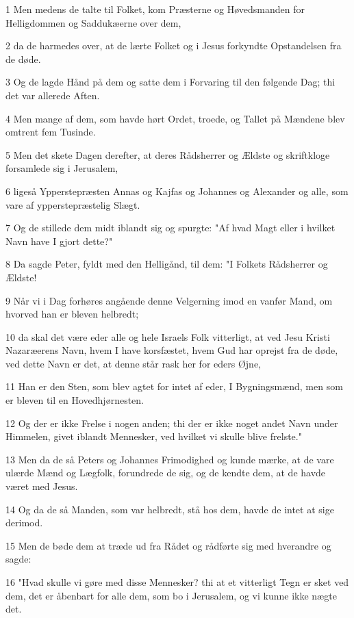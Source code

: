 \par 1 Men medens de talte til Folket, kom Præsterne og Høvedsmanden for Helligdommen og Saddukæerne over dem,
\par 2 da de harmedes over, at de lærte Folket og i Jesus forkyndte Opstandelsen fra de døde.
\par 3 Og de lagde Hånd på dem og satte dem i Forvaring til den følgende Dag; thi det var allerede Aften.
\par 4 Men mange af dem, som havde hørt Ordet, troede, og Tallet på Mændene blev omtrent fem Tusinde.
\par 5 Men det skete Dagen derefter, at deres Rådsherrer og Ældste og skriftkloge forsamlede sig i Jerusalem,
\par 6 ligeså Ypperstepræsten Annas og Kajfas og Johannes og Alexander og alle, som vare af ypperstepræstelig Slægt.
\par 7 Og de stillede dem midt iblandt sig og spurgte: "Af hvad Magt eller i hvilket Navn have I gjort dette?"
\par 8 Da sagde Peter, fyldt med den Helligånd, til dem: "I Folkets Rådsherrer og Ældste!
\par 9 Når vi i Dag forhøres angående denne Velgerning imod en vanfør Mand, om hvorved han er bleven helbredt;
\par 10 da skal det være eder alle og hele Israels Folk vitterligt, at ved Jesu Kristi Nazaræerens Navn, hvem I have korsfæstet, hvem Gud har oprejst fra de døde, ved dette Navn er det, at denne står rask her for eders Øjne,
\par 11 Han er den Sten, som blev agtet for intet af eder, I Bygningsmænd, men som er bleven til en Hovedhjørnesten.
\par 12 Og der er ikke Frelse i nogen anden; thi der er ikke noget andet Navn under Himmelen, givet iblandt Mennesker, ved hvilket vi skulle blive frelste."
\par 13 Men da de så Peters og Johannes Frimodighed og kunde mærke, at de vare ulærde Mænd og Lægfolk, forundrede de sig, og de kendte dem, at de havde været med Jesus.
\par 14 Og da de så Manden, som var helbredt, stå hos dem, havde de intet at sige derimod.
\par 15 Men de bøde dem at træde ud fra Rådet og rådførte sig med hverandre og sagde:
\par 16 "Hvad skulle vi gøre med disse Mennesker? thi at et vitterligt Tegn er sket ved dem, det er åbenbart for alle dem, som bo i Jerusalem, og vi kunne ikke nægte det.
